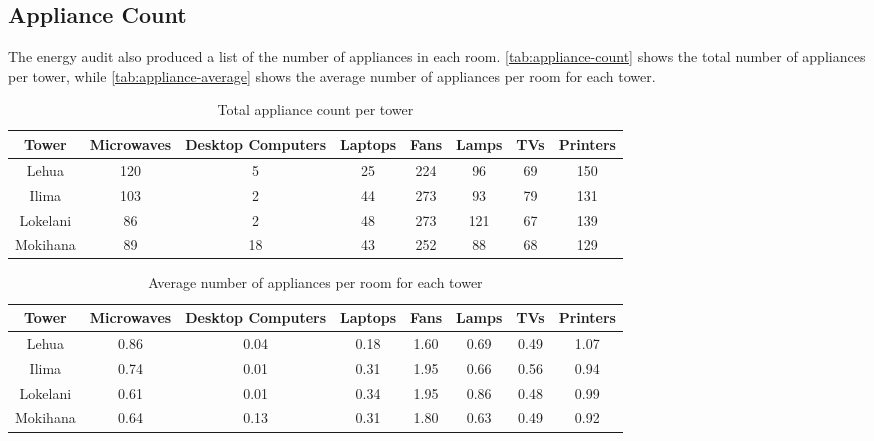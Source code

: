 \subsection{Appliance Count}
\label{sec:appliance-count}

The energy audit also produced a list of the number of appliances in each room. \autoref{tab:appliance-count} shows the total number of appliances per tower, while \autoref{tab:appliance-average} shows the average number of appliances per room for each tower.

\begin{table}[htbp]
	\centering
		\begin{tabular}{| c || c | c | c | c | c | c | c |}
			\hline
			Tower & Microwaves & Desktop Computers & Laptops & Fans & Lamps & TVs & Printers \tabularnewline \hline \hline
			
			Lehua & 120 & 5 & 25 & 224 & 96 & 69 & 150 \tabularnewline \hline

			Ilima & 103 & 2 & 44 & 273 & 93 & 79 & 131 \tabularnewline \hline

			Lokelani & 86 & 2 & 48 & 273 & 121 & 67 & 139 \tabularnewline \hline

			Mokihana & 89 & 18 & 43 & 252 & 88 & 68 & 129  \tabularnewline \hline

		\end{tabular}
	\caption{Total appliance count per tower}
\label{tab:appliance-count}
\end{table}

\begin{table}[htbp]
	\centering
		\begin{tabular}{| c || c | c | c | c | c | c | c |}
			\hline
			Tower & Microwaves & Desktop Computers & Laptops & Fans & Lamps & TVs & Printers \tabularnewline \hline \hline
			
			Lehua & 0.86 & 0.04 & 0.18 & 1.60 & 0.69 & 0.49 & 1.07 \tabularnewline \hline

			Ilima & 0.74 & 0.01 & 0.31 & 1.95 & 0.66 & 0.56 & 0.94 \tabularnewline \hline

			Lokelani & 0.61 & 0.01 & 0.34 & 1.95 & 0.86 & 0.48 & 0.99 \tabularnewline \hline

			Mokihana & 0.64 & 0.13 & 0.31 & 1.80 & 0.63 & 0.49 & 0.92 \tabularnewline \hline

		\end{tabular}
	\caption{Average number of appliances per room for each tower}
\label{tab:appliance-average}
\end{table}


